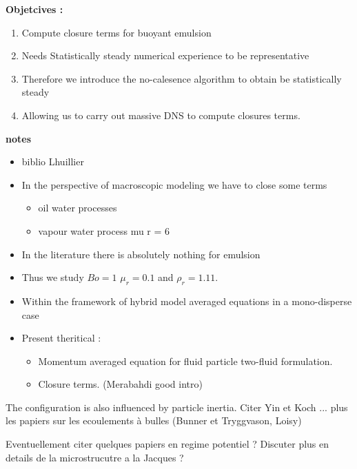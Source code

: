 \textbf{Objetcives : }

\begin{enumerate}
    \item Compute closure terms for buoyant emulsion
    \item Needs Statistically steady numerical experience to be representative 
    \item Therefore we introduce the no-calesence algorithm to obtain be statistically steady
    \item Allowing us to carry out massive DNS to compute closures terms. 
\end{enumerate}
\vspace*{1cm}
\textbf{notes}
\begin{itemize}
    \item biblio Lhuillier
    \item In the perspective of macroscopic modeling we have to close some terms 
    \begin{itemize}
        \item oil water processes
        \item vapour water process mu r = 6 
    \end{itemize}
    \item In the literature there is absolutely nothing for emulsion 
    \item Thus we study $Bo = 1$ $\mu_r = 0.1$ and $\rho_r = 1.11$. 
    \item Within the framework of hybrid model averaged equations in a mono-disperse case 
    \item Present theritical : 
     \begin{itemize}
        \item Momentum averaged equation for fluid particle two-fluid formulation. 
        \item Closure terms. (Merabahdi good intro)
    \end{itemize}
\end{itemize}

The configuration is also influenced by particle inertia. Citer Yin et Koch ... plus les papiers sur les ecoulements à bulles (Bunner et Tryggvason, Loisy)

Eventuellement citer quelques papiers en regime potentiel ? Discuter plus en details de la microstrucutre a la Jacques ?

